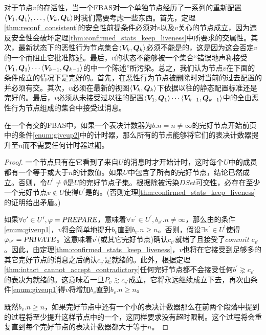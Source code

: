 对于节点$v$的存活性，当一个FBAS对一个单独节点经历了一系列的重新配置$\langle {\bm V_1},{\bm Q_1}\rangle,\ldots,\langle {\bm V_k},{\bm Q_k}\rangle$时我们需要考虑一些东西。首先，定理\ref{thm:reconf_consistent}的安全性前提条件必须对$v$以及$v$关心的节点成立，因为违反安全性会破坏定理\ref{thm:confirmed_stats_keep_liveness}中所要求的{\quorum}交属性。其次，最新状态下的恶性行为节点集合$\langle {\bm V_k}, {\bm Q_k}\rangle$必须不能是{\vblock}的，这是因为这会否定$v$的一个{\quorum}而阻止它批准陈述。最后，$v$的状态不能够被一个{\vblock}集合``错误地声称接受$\langle {\bm V_1},{\bm Q_1}\rangle\cdots \langle {\bm V_{k-1},{\bm Q_{k-1}}\rangle}$的中一个陈述''所污染。总之，我们认为节点$v$在下面的条件成立的情况下是完好的。首先，在恶性行为节点被删除时对当前{\slot}的过去配置的并必须有{\quorum}交。其次，$v$必须在最新的视图$\langle {\bm V_k}, {\bm Q_k}\rangle$下依据以往的静态配置标准还是完好的。最后，$v$必须从未接受过以往的配置$\langle {\bm V_1},{\bm Q_1}\rangle\cdots \langle {\bm V_{k-1},{\bm Q_{k-1}}\rangle}$中的全由恶性行为节点组成的{\vblock}集合中接受过消息。

\begin{theorem}\label{thm:nodes_raise_ballot_counter}
        在一个有{\quorum}交的FBAS中，如果一个表决计数器为$b.n=n\neq \infty$的完好节点开始前页中的条件\ref{enum:giveup2}中的计时器，那么所有的节点能够将它们的表决计数器提升至$n$而不需要任何计时器过期。
\end{theorem}

\begin{proof}
        一个节点只有在它看到了来自{\quorum}$U$的消息时才开始计时，这时每个$U$中的成员都有一个等于或大于$n$的计数值。如果$U$中包含了所有的完好节点，结论已然成立。否则，令$U^{\prime}\neq \emptyset$是$U$的完好节点子集。根据除被污染$DSet${\quorum}可交性，必存在至少一个完好节点$v\not\in U$使得$U^{\prime}$是{\vblock}的。(否则定理\ref{thm:confirmed_stats_keep_liveness}的证明给出矛盾。)
        
	如果$\forall v^{\prime}\in U^{\prime},\varphi=\textsl{PREPARE}$，意味着$\forall v^{\prime}\in U^{\prime},b_{v^{\prime}}.n\neq \infty$，那么由的条件\ref{enum:giveup1}，$v$将会简单地提升$b_v$直到$b_v.n\geq n$。否则，假设$\exists v^{\prime}\in U^{\prime}$使得$\varphi_{v^{\prime}}=\textsl{PRIVATE}$。这意味着$v^{\prime}$(或其它完好节点)确认$c_{v^{\prime}}$就绪了且接受了$commit\;c_{v^{\prime}}$。因此，由定理\ref{thm:confirmed_stats_keep_liveness}，$v$也将在它接受到足够多的其它完好节点的消息之后确认$c_{v^{\prime}}$是就绪的。此外，根据定理\ref{thm:intact_cannot_accept_contradictory}任何完好节点都不会接受任何$b^{\prime}\gnsim c_{v^{\prime}}$的表决为就绪的。这意味着一旦$P_v\gtrsim c_{v^{\prime}}$成立，它将永远继续成立下去，再次由条件\ref{enum:giveup1}得$v$将增加$b_v$直到$b_v.n\geq n$。
        
        既然$b_v.n\geq n$，如果完好节点中还有一个小的表决计数器那么在前两个段落中提到的过程将至少提升这样节点中的一个，这同样要求没有超时限制。这个过程将会重复直到每个完好节点的表决计数器都大于等于$n$。
\end{proof}

